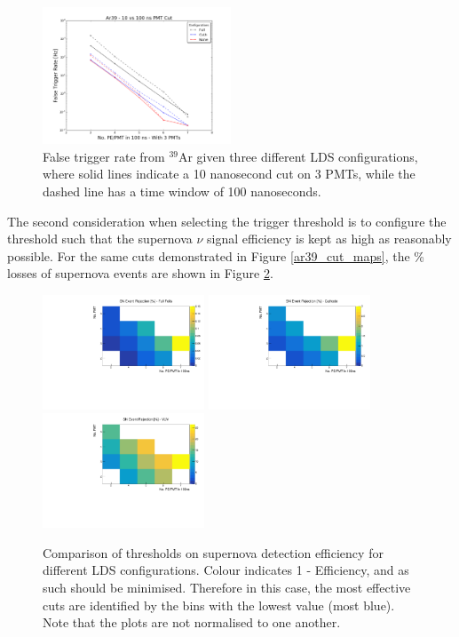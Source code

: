 \documentclass[a4paper]{article}
\begin{document}
\begin{figure}[H]
\center
\includegraphics[width=0.5\textwidth]{ar39_10v100.png}
\caption{False trigger rate from $^{39}$Ar given three different LDS configurations, where solid lines indicate a 10 nanosecond cut on 3 PMTs, while the dashed line has a time window of 100 nanoseconds.}\label{10vs100}
\end{figure}

The second consideration when selecting the trigger threshold is to configure the threshold such that the supernova $\nu$ signal efficiency is kept as high as reasonably possible. For the same cuts demonstrated in Figure \ref{ar39_cut_maps}, the \% losses of supernova events are shown in Figure \ref{sn_cut_maps}.

\begin{figure}[H]
  \center
      \includegraphics[width=0.43\textwidth]{sn_trigger_map_fullfoils.pdf}
      \includegraphics[width=0.43\textwidth]{sn_trigger_map_cathode.pdf}
      \includegraphics[width=0.43\textwidth]{sn_trigger_map_vuv.pdf}
      \caption{Comparison of thresholds on supernova detection efficiency for different LDS configurations. Colour indicates 1 - Efficiency, and as such should be minimised. Therefore in this case, the most effective cuts are identified by the bins with the lowest value (most blue). Note that the plots are not normalised to one another.}\label{sn_cut_maps}
\end{figure}
\end{document}
